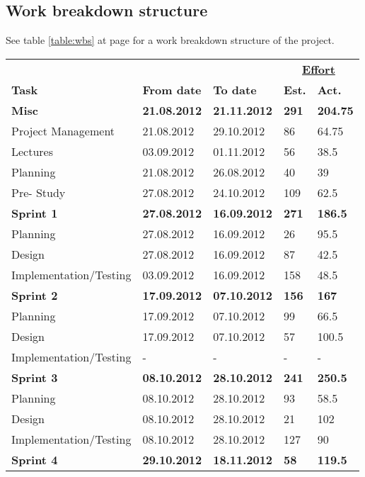 \subsection{Work breakdown structure}

See table \ref{table:wbs} at page \pageref{table:wbs} for a work breakdown structure of the project.

\begin{table}
\begin{center}

\begin{tabular}{ l|l|l|l|l } \hline
&	 &	 &\multicolumn{2}{c}{\underline{\textbf{Effort}}}	 \\
\textbf{Task}	 & \textbf{From date}	 & \textbf{To date}	 & \textbf{Est.} & \textbf{Act.}	 \\ \hline \hline
\textbf{Misc} & \textbf{21.08.2012} & \textbf{21.11.2012} & \textbf{291} & \textbf{204.75} \\ \hline
Project Management & 21.08.2012 & 29.10.2012 & 86 & 64.75 \\
Lectures & 03.09.2012 & 01.11.2012 & 56 & 38.5\\
Planning & 21.08.2012 & 26.08.2012 & 40 & 39 \\
Pre- Study &27.08.2012  & 24.10.2012 & 109 & 62.5\\ \hline
\bf{Sprint 1}	&\bf{27.08.2012} & \bf{16.09.2012} & \bf{271} & \textbf{186.5} \\ \hline
Planning & 27.08.2012 & 16.09.2012 & 26 & 95.5 \\
Design & 27.08.2012 & 16.09.2012 & 87 & 42.5\\
Implementation/Testing & 03.09.2012 & 16.09.2012 & 158 & 48.5\\ \hline
\bf{Sprint 2} & \bf{17.09.2012} & \bf{07.10.2012} & \bf{156} & \textbf{167} \\ \hline
Planning & 17.09.2012 & 07.10.2012 & 99 & 66.5\\
Design& 17.09.2012 & 07.10.2012 & 57 & 100.5\\
Implementation/Testing & - & - & - & -\\ \hline
\bf{Sprint 3}	 & \bf{08.10.2012} & \bf{28.10.2012} & \bf{241} & \textbf{250.5}\\ \hline
Planning & 08.10.2012 & 28.10.2012 & 93 & 58.5 \\
Design & 08.10.2012 & 28.10.2012 & 21 & 102\\
Implementation/Testing & 08.10.2012 & 28.10.2012 & 127 & 90\\ \hline
\bf{Sprint 4}	& \bf{29.10.2012} & \bf{18.11.2012} & \bf{58}  & \bf{119.5}  \\ \hline

\end{tabular}
\end{center}
\end{table}
